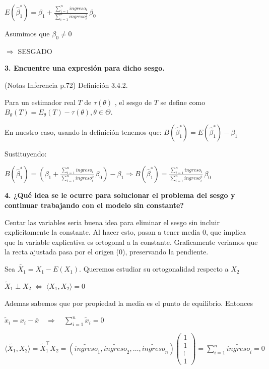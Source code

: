 \documentclass[
  letterpaper,
  DIV=11,
  numbers=noendperiod]{scrartcl}
\begin{document}
\(E\left(\hat{\beta}_1^{*}\right)= \beta_1 + \frac{\sum_{i=1}^n ingreso_i}{\sum_{i=1}^n ingreso_i^2} \, \beta_0\)

Asumimos que \(\beta_0 \neq 0\)

\(\Rightarrow\) SESGADO

\textbf{3. Encuentre una expresión para dicho sesgo.}

(Notas Inferencia p.72) Definición 3.4.2.

Para un estimador real \(T\) de \(\tau(\theta)\) , el sesgo de \(T\) se
define como
\(B_{\theta}(T) = E_{\theta}(T) - \tau(\theta), \theta \in \Theta\).

En nuestro caso, usando la definición tenemos que:
\(B(\hat{\beta}_1^{*}) = E(\hat{\beta}_1 ^{ * } ) - \beta_1\)

Sustituyendo:

\(B(\hat{\beta}_1^{*}) = \left( \beta_1 + \frac{\sum_{i=1}^n ingreso_i}{\sum_{i=1}^n ingreso_i^2} \, \beta_0 \right) - \beta_1 \Rightarrow B(\hat{\beta}_1^{*}) = \frac{\sum_{i=1}^n ingreso_i}{\sum_{i=1}^n ingreso_i^2} \, \beta_0\)

\textbf{4. ¿Qué idea se le ocurre para solucionar el problema del sesgo
y continuar trabajando con el modelo sin constante?}

Centar las variables seria buena idea para eliminar el sesgo sin incluir
explicitamente la constante. Al hacer esto, pasan a tener media 0, que
implica que la variable explicativa es ortogonal a la constante.
Graficamente veriamos que la recta ajustada pasa por el origen (0),
preservando la pendiente.

Sea \(\tilde{X_1}=X_1 - E(X_1)\). Queremos estudiar su ortogonalidad
respecto a \(X_2\)

\(\tilde{X}_1 \perp X_2 \;\Longleftrightarrow\; \langle X_1, X_2 \rangle = 0\)

Ademas sabemos que por propiedad la media es el punto de equilibrio.
Entonces

\(\tilde{x}_i = x_i - \bar{x}\quad \Rightarrow \quad\sum_{i=1}^n \tilde{x}_i = 0\)

\(\langle \tilde{X_1}, X_2 \rangle = \tilde{X}_1^\top X_2 = (\tilde{ingreso}_1, \tilde{ingreso}_2, \ldots, \tilde{ingreso}_n)\begin{pmatrix}1 \\ 1 \\ \vdots \\ 1\end{pmatrix}= \sum_{i=1}^n \tilde{ingreso}_i = 0\)
\end{document}
